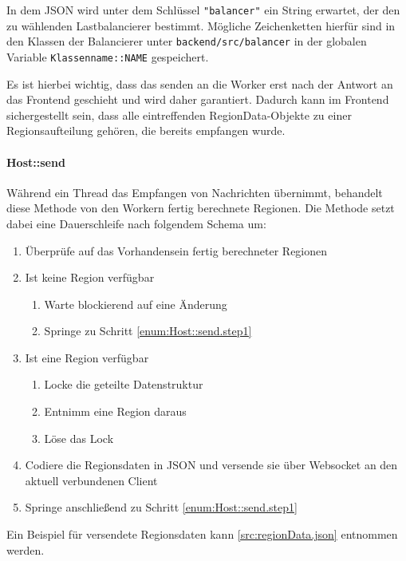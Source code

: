 In dem JSON wird unter dem Schlüssel \texttt{"balancer"} ein String erwartet, der den zu wählenden Lastbalancierer bestimmt.
Mögliche Zeichenketten hierfür sind in den Klassen der Balancierer unter \verb|backend/src/balancer| in der globalen Variable
\verb|Klassenname::NAME| gespeichert.

Es ist hierbei wichtig, dass das senden an die Worker erst nach der Antwort an das Frontend geschieht und wird daher garantiert.
Dadurch kann im Frontend sichergestellt sein, dass alle eintreffenden RegionData-Objekte zu einer Regionsaufteilung gehören,
die bereits empfangen wurde.

\paragraph{Host::send}\label{cls:Host::send}

Während ein Thread das Empfangen von Nachrichten übernimmt, behandelt diese Methode von den Workern fertig berechnete Regionen.
Die Methode setzt dabei eine Dauerschleife nach folgendem Schema um:

\begin{enumerate}
	\item Überprüfe auf das Vorhandensein fertig berechneter Regionen \label{enum:Host::send.step1}
	\item Ist keine Region verfügbar
	      \begin{enumerate}
		      \item Warte blockierend auf eine Änderung
		      \item Springe zu Schritt \ref{enum:Host::send.step1}
	      \end{enumerate}
	\item Ist eine Region verfügbar
	      \begin{enumerate}
		      \item Locke die geteilte Datenstruktur
		      \item Entnimm eine Region daraus
		      \item Löse das Lock
	      \end{enumerate}
	\item Codiere die Regionsdaten in JSON und versende sie über Websocket an den aktuell verbundenen Client
	\item Springe anschließend zu Schritt \ref{enum:Host::send.step1}
\end{enumerate}

Ein Beispiel für versendete Regionsdaten kann \autoref{src:regionData.json} entnommen werden.

